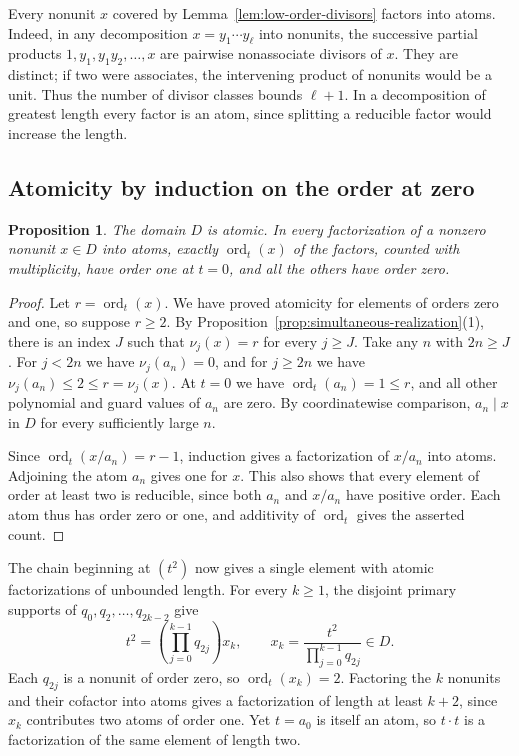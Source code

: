 \documentclass{article}
\DeclareMathOperator{\ord}{ord}
\newtheorem{proposition}{Proposition}[section]
\theoremstyle{remark}
\begin{document}
Every nonunit $x$ covered by Lemma~\ref{lem:low-order-divisors} factors into atoms.
Indeed, in any decomposition $x = y_1 \cdots y_\ell$ into nonunits, the successive partial products $1, y_1, y_1 y_2, \ldots, x$ are pairwise nonassociate divisors of $x$.
They are distinct; if two were associates, the intervening product of nonunits would be a unit.
Thus the number of divisor classes bounds $\ell + 1$.
In a decomposition of greatest length every factor is an atom, since splitting a reducible factor would increase the length.

\subsection{Atomicity by induction on the order at zero}

\begin{proposition}
    \label{prop:atomicity-D}
    The domain $D$ is atomic.
    In every factorization of a nonzero nonunit $x \in D$ into atoms, exactly $\ord_t(x)$ of the factors, counted with multiplicity, have order one at $t = 0$, and all the others have order zero.
\end{proposition}

\begin{proof}
    Let $r = \ord_t(x)$.
    We have proved atomicity for elements of orders zero and one, so suppose $r \ge 2$.
    By Proposition~\ref{prop:simultaneous-realization}(1), there is an index $J$ such that $\nu_j(x) = r$ for every $j \ge J$.
    Take any $n$ with $2n \ge J$.
    For $j < 2n$ we have $\nu_j(a_n) = 0$, and for $j \ge 2n$ we have $\nu_j(a_n) \le 2 \le r = \nu_j(x)$.
    At $t = 0$ we have $\ord_t(a_n) = 1 \le r$, and all other polynomial and guard values of $a_n$ are zero.
    By coordinatewise comparison, $a_n \mid x$ in $D$ for every sufficiently large $n$.

    Since $\ord_t(x/a_n) = r - 1$, induction gives a factorization of $x/a_n$ into atoms.
    Adjoining the atom $a_n$ gives one for $x$.
    This also shows that every element of order at least two is reducible, since both $a_n$ and $x/a_n$ have positive order.
    Each atom thus has order zero or one, and additivity of $\ord_t$ gives the asserted count.
\end{proof}

The chain beginning at $(t^2)$ now gives a single element with atomic factorizations of unbounded length.
For every $k \ge 1$, the disjoint primary supports of $q_0, q_2, \ldots, q_{2k - 2}$ give
\[
    t^2 = \left(\prod_{j = 0}^{k - 1} q_{2j}\right) x_k,
    \qquad x_k = \frac{t^2}{\prod_{j = 0}^{k - 1} q_{2j}} \in D.
\]
Each $q_{2j}$ is a nonunit of order zero, so $\ord_t(x_k) = 2$.
Factoring the $k$ nonunits and their cofactor into atoms gives a factorization of length at least $k + 2$, since $x_k$ contributes two atoms of order one.
Yet $t = a_0$ is itself an atom, so $t \cdot t$ is a factorization of the same element of length two.
\end{document}
